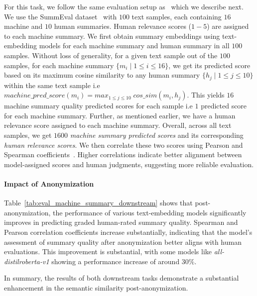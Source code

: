 For this task, we follow the same evaluation setup as~\citet{muennighoff2022mteb} which we describe next. We use the SummEval dataset~\cite{fabbri2021summeval, muennighoff2022mteb} with $100$ text samples, each containing $16$ machine and $10$ human summaries. Human relevance scores ($1{-}5$) are assigned to each machine summary. We first obtain summary embeddings using text-embedding models for each machine summary and human summary in all $100$ samples. Without loss of generality, for a given text sample out of the $100$ samples, for each machine summary $\{m_i \mid 1 \leq i \leq 16\}$, we get its predicted score based on its maximum cosine similarity to any human summary $\{h_j \mid 1 \leq j \leq 10\}$ within the same text sample i.e $machine\_pred\_score(m_i)= max_{1 \leq j \leq 10}\; cos\_sim(m_i, h_j)$. This yields $16$ machine summary quality predicted scores for each sample i.e $1$ predicted score for each machine summary. Further, as mentioned earlier, we have a human relevance score assigned to each machine summary. Overall, across all text samples, we get $1600$ \textit{machine summary predicted scores} and its corresponding \textit{human relevance scores}.  We then correlate these two scores using Pearson and Spearman coefficients~\cite{muennighoff2022mteb}. Higher correlations indicate better alignment between model-assigned scores and human judgments, suggesting more reliable evaluation.
\vspace{-0.1in}



\paragraph{Impact of Anonymization}


Table~\ref{tab:eval_machine_summary_downstream} shows that post-anonymization, the performance of various text-embedding models significantly improves in predicting graded human-rated summary quality. Spearman and Pearson correlation coefficients increase substantially, indicating that the model's assessment of summary quality after anonymization better aligns with human evaluations. This improvement is substantial, with some models like \textit{all-distilroberta-v1} showing a performance increase of around $30\%$.

\noindent
In summary, the results of both downstream tasks demonstrate a substantial enhancement in the semantic similarity post-anonymization. 







